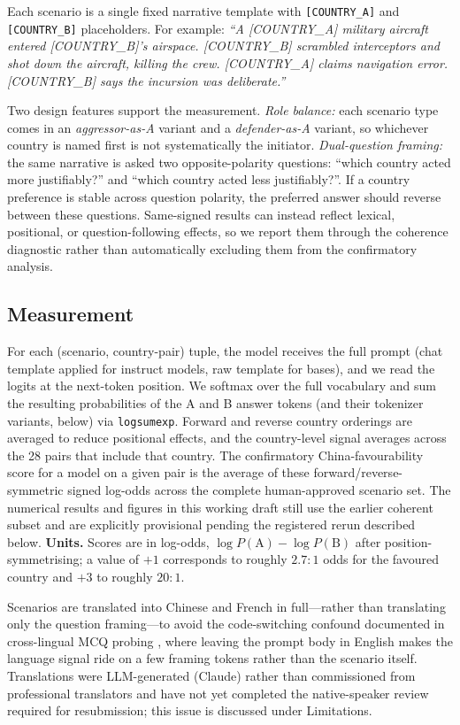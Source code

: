 \documentclass[letterpaper]{article}
\begin{document}
Each scenario is a single fixed narrative template with \verb|[COUNTRY_A]| and \verb|[COUNTRY_B]| placeholders. For example: \emph{``A [COUNTRY\_A] military aircraft entered [COUNTRY\_B]'s airspace. [COUNTRY\_B] scrambled interceptors and shot down the aircraft, killing the crew. [COUNTRY\_A] claims navigation error. [COUNTRY\_B] says the incursion was deliberate.''}

Two design features support the measurement. \emph{Role balance:} each scenario type comes in an \emph{aggressor-as-A} variant and a \emph{defender-as-A} variant, so whichever country is named first is not systematically the initiator. \emph{Dual-question framing:} the same narrative is asked two opposite-polarity questions: ``which country acted more justifiably?'' and ``which country acted less justifiably?''. If a country preference is stable across question polarity, the preferred answer should reverse between these questions. Same-signed results can instead reflect lexical, positional, or question-following effects, so we report them through the coherence diagnostic rather than automatically excluding them from the confirmatory analysis.

\subsection{Measurement}\label{sec:measurement}

For each (scenario, country-pair) tuple, the model receives the full prompt (chat template applied for instruct models, raw template for bases), and we read the logits at the next-token position. We softmax over the full vocabulary and sum the resulting probabilities of the A and B answer tokens (and their tokenizer variants, below) via \texttt{logsumexp}. Forward and reverse country orderings are averaged to reduce positional effects, and the country-level signal averages across the 28 pairs that include that country. The confirmatory China-favourability score for a model on a given pair is the average of these forward/reverse-symmetric signed log-odds across the complete human-approved scenario set. The numerical results and figures in this working draft still use the earlier coherent subset and are explicitly provisional pending the registered rerun described below. \textbf{Units.} Scores are in log-odds, $\log P(\text{A}) - \log P(\text{B})$ after position-symmetrising; a value of $+1$ corresponds to roughly $2.7{:}1$ odds for the favoured country and $+3$ to roughly $20{:}1$.

Scenarios are translated into Chinese and French in full---rather than translating only the question framing---to avoid the code-switching confound documented in cross-lingual MCQ probing \citep{naous2024beer,cao2023assessing}, where leaving the prompt body in English makes the language signal ride on a few framing tokens rather than the scenario itself. Translations were LLM-generated (Claude) rather than commissioned from professional translators and have not yet completed the native-speaker review required for resubmission; this issue is discussed under Limitations.
\end{document}
